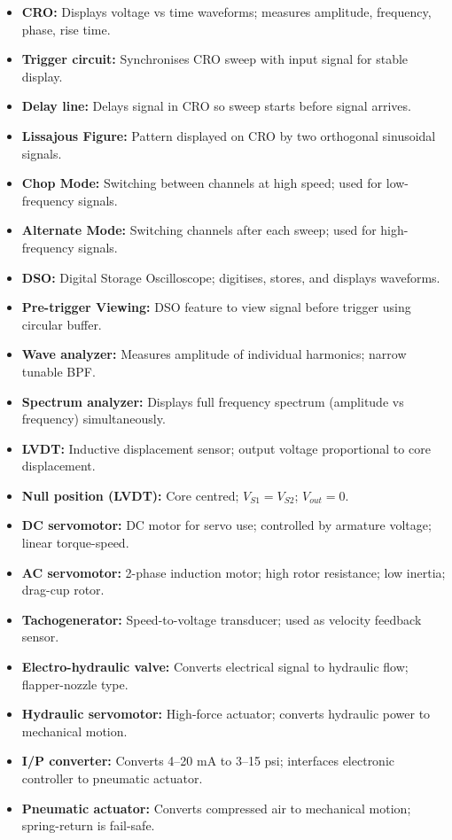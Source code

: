 \documentclass[12pt,a4paper]{article}
\begin{document}
\begin{tcolorbox}[defbox, title={\textbf{One-Line Definitions}}]
\begin{itemize}[leftmargin=*, itemsep=3pt, topsep=0pt]
  \item \textbf{CRO:} Displays voltage vs time waveforms; measures amplitude, frequency, phase, rise time.
  \item \textbf{Trigger circuit:} Synchronises CRO sweep with input signal for stable display.
  \item \textbf{Delay line:} Delays signal in CRO so sweep starts before signal arrives.
  \item \textbf{Lissajous Figure:} Pattern displayed on CRO by two orthogonal sinusoidal signals.
  \item \textbf{Chop Mode:} Switching between channels at high speed; used for low-frequency signals.
  \item \textbf{Alternate Mode:} Switching channels after each sweep; used for high-frequency signals.
  \item \textbf{DSO:} Digital Storage Oscilloscope; digitises, stores, and displays waveforms.
  \item \textbf{Pre-trigger Viewing:} DSO feature to view signal before trigger using circular buffer.
  \item \textbf{Wave analyzer:} Measures amplitude of individual harmonics; narrow tunable BPF.
  \item \textbf{Spectrum analyzer:} Displays full frequency spectrum (amplitude vs frequency) simultaneously.
  \item \textbf{LVDT:} Inductive displacement sensor; output voltage proportional to core displacement.
  \item \textbf{Null position (LVDT):} Core centred; $V_{S1}=V_{S2}$; $V_{out}=0$.
  \item \textbf{DC servomotor:} DC motor for servo use; controlled by armature voltage; linear torque-speed.
  \item \textbf{AC servomotor:} 2-phase induction motor; high rotor resistance; low inertia; drag-cup rotor.
  \item \textbf{Tachogenerator:} Speed-to-voltage transducer; used as velocity feedback sensor.
  \item \textbf{Electro-hydraulic valve:} Converts electrical signal to hydraulic flow; flapper-nozzle type.
  \item \textbf{Hydraulic servomotor:} High-force actuator; converts hydraulic power to mechanical motion.
  \item \textbf{I/P converter:} Converts 4--20 mA to 3--15 psi; interfaces electronic controller to pneumatic actuator.
  \item \textbf{Pneumatic actuator:} Converts compressed air to mechanical motion; spring-return is fail-safe.
\end{itemize}
\end{tcolorbox}
\end{document}
